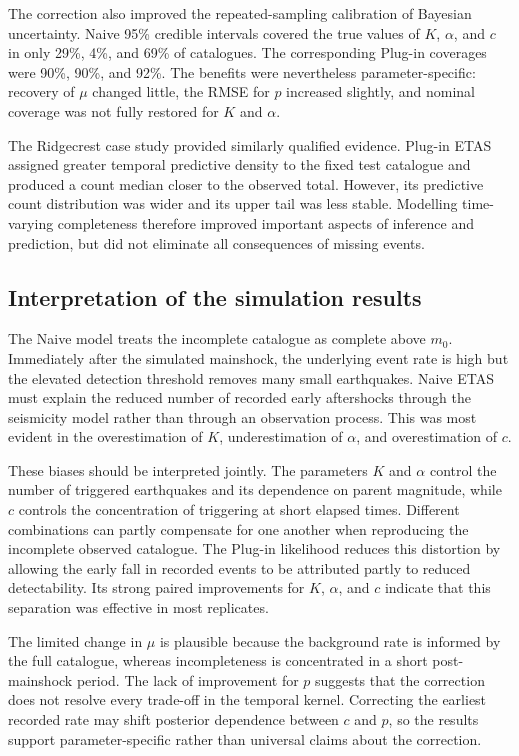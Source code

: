 \documentclass{statsmsc}
\begin{document}
The correction also improved the repeated-sampling calibration of Bayesian
uncertainty. Naive 95\% credible intervals covered the true values of
\(K\), \(\alpha\), and \(c\) in only 29\%, 4\%, and 69\% of catalogues.
The corresponding Plug-in coverages were 90\%, 90\%, and 92\%. The benefits
were nevertheless parameter-specific: recovery of \(\mu\) changed little,
the RMSE for \(p\) increased slightly, and nominal coverage was not fully
restored for \(K\) and \(\alpha\).

The Ridgecrest case study provided similarly qualified evidence. Plug-in ETAS
assigned greater temporal predictive density to the fixed test catalogue and
produced a count median closer to the observed total. However, its predictive
count distribution was wider and its upper tail was less stable. Modelling
time-varying completeness therefore improved important aspects of inference
and prediction, but did not eliminate all consequences of missing events.

\subsection{Interpretation of the simulation results}

The Naive model treats the incomplete catalogue as complete above \(m_0\).
Immediately after the simulated mainshock, the underlying event rate is high
but the elevated detection threshold removes many small earthquakes. Naive
ETAS must explain the reduced number of recorded early aftershocks through the
seismicity model rather than through an observation process. This was most
evident in the overestimation of \(K\), underestimation of \(\alpha\), and
overestimation of \(c\).

These biases should be interpreted jointly. The parameters \(K\) and
\(\alpha\) control the number of triggered earthquakes and its dependence on
parent magnitude, while \(c\) controls the concentration of triggering at
short elapsed times. Different combinations can partly compensate for one
another when reproducing the incomplete observed catalogue. The Plug-in
likelihood reduces this distortion by allowing the early fall in recorded
events to be attributed partly to reduced detectability. Its strong paired
improvements for \(K\), \(\alpha\), and \(c\) indicate that this separation
was effective in most replicates.

The limited change in \(\mu\) is plausible because the background rate is
informed by the full catalogue, whereas incompleteness is concentrated in a
short post-mainshock period. The lack of improvement for \(p\) suggests that
the correction does not resolve every trade-off in the temporal kernel.
Correcting the earliest recorded rate may shift posterior dependence between
\(c\) and \(p\), so the results support parameter-specific rather than
universal claims about the correction.
\end{document}
